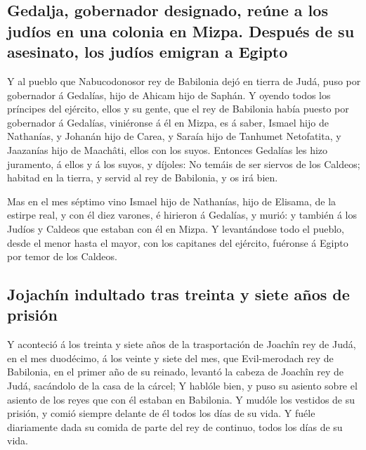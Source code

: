 \hypertarget{gedalja-gobernador-designado-reuxfane-a-los-juduxedos-en-una-colonia-en-mizpa.-despuuxe9s-de-su-asesinato-los-juduxedos-emigran-a-egipto}{%
\subsection{Gedalja, gobernador designado, reúne a los judíos en una
colonia en Mizpa. Después de su asesinato, los judíos emigran a
Egipto}\label{gedalja-gobernador-designado-reuxfane-a-los-juduxedos-en-una-colonia-en-mizpa.-despuuxe9s-de-su-asesinato-los-juduxedos-emigran-a-egipto}}

 Y al pueblo que Nabucodonosor rey de Babilonia dejó en
tierra de Judá, puso por gobernador á Gedalías, hijo de Ahicam hijo de
Saphán.  Y oyendo todos los príncipes del ejército, ellos
y su gente, que el rey de Babilonia había puesto por gobernador á
Gedalías, viniéronse á él en Mizpa, es á saber, Ismael hijo de
Nathanías, y Johanán hijo de Carea, y Saraía hijo de Tanhumet
Netofatita, y Jaazanías hijo de Maachâti, ellos con los suyos.
 Entonces Gedalías les hizo juramento, á ellos y á los
suyos, y díjoles: No temáis de ser siervos de los Caldeos; habitad en la
tierra, y servid al rey de Babilonia, y os irá bien.

 Mas en el mes séptimo vino Ismael hijo de Nathanías,
hijo de Elisama, de la estirpe real, y con él diez varones, é hirieron á
Gedalías, y murió: y también á los Judíos y Caldeos que estaban con él
en Mizpa.  Y levantándose todo el pueblo, desde el menor
hasta el mayor, con los capitanes del ejército, fuéronse á Egipto por
temor de los Caldeos.

\hypertarget{jojachuxedn-indultado-tras-treinta-y-siete-auxf1os-de-prisiuxf3n}{%
\subsection{Jojachín indultado tras treinta y siete años de
prisión}\label{jojachuxedn-indultado-tras-treinta-y-siete-auxf1os-de-prisiuxf3n}}

 Y aconteció á los treinta y siete años de la
trasportación de Joachîn rey de Judá, en el mes duodécimo, á los veinte
y siete del mes, que Evil-merodach rey de Babilonia, en el primer año de
su reinado, levantó la cabeza de Joachîn rey de Judá, sacándolo de la
casa de la cárcel;  Y hablóle bien, y puso su asiento
sobre el asiento de los reyes que con él estaban en Babilonia.
 Y mudóle los vestidos de su prisión, y comió siempre
delante de él todos los días de su vida.  Y fuéle
diariamente dada su comida de parte del rey de continuo, todos los días
de su vida.
